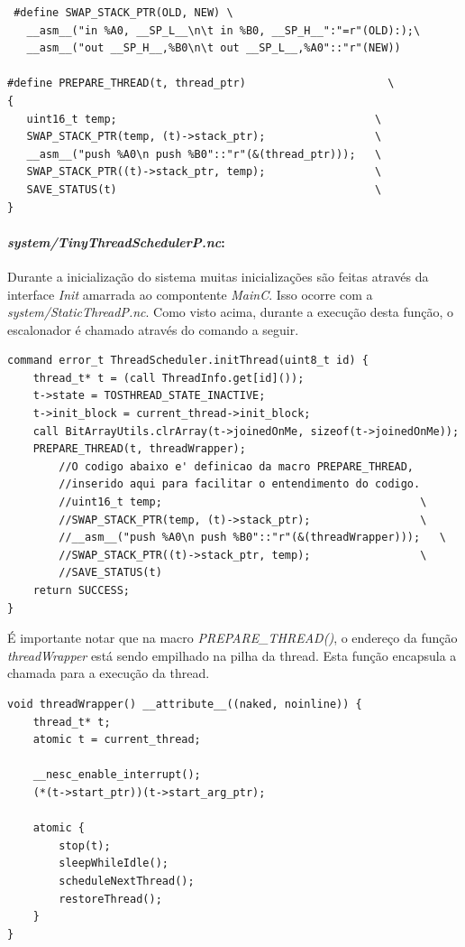 \begin{lstlisting}
 #define SWAP_STACK_PTR(OLD, NEW) \
   __asm__("in %A0, __SP_L__\n\t in %B0, __SP_H__":"=r"(OLD):);\
   __asm__("out __SP_H__,%B0\n\t out __SP_L__,%A0"::"r"(NEW))
 
#define PREPARE_THREAD(t, thread_ptr)                      \
{  
   uint16_t temp;                                        \
   SWAP_STACK_PTR(temp, (t)->stack_ptr);                 \
   __asm__("push %A0\n push %B0"::"r"(&(thread_ptr)));   \
   SWAP_STACK_PTR((t)->stack_ptr, temp);                 \
   SAVE_STATUS(t)                                        \
}
\end{lstlisting}

\paragraph{\textit{system/TinyThreadSchedulerP.nc}:}
Durante a inicialização do sistema muitas inicializações são feitas através da interface \textit{Init} amarrada ao
compontente \textit{MainC}. Isso ocorre com a \textit{system/StaticThreadP.nc}. Como visto acima, durante a execução
desta função, o escalonador é chamado através do comando a seguir.
\begin{lstlisting}
command error_t ThreadScheduler.initThread(uint8_t id) {
    thread_t* t = (call ThreadInfo.get[id]());
    t->state = TOSTHREAD_STATE_INACTIVE;
    t->init_block = current_thread->init_block;
    call BitArrayUtils.clrArray(t->joinedOnMe, sizeof(t->joinedOnMe));
    PREPARE_THREAD(t, threadWrapper);
        //O codigo abaixo e' definicao da macro PREPARE_THREAD,
        //inserido aqui para facilitar o entendimento do codigo.
        //uint16_t temp;                                        \
        //SWAP_STACK_PTR(temp, (t)->stack_ptr);                 \
        //__asm__("push %A0\n push %B0"::"r"(&(threadWrapper)));   \
        //SWAP_STACK_PTR((t)->stack_ptr, temp);                 \
        //SAVE_STATUS(t)   
    return SUCCESS;
}
\end{lstlisting}
É importante notar que na macro \textit{PREPARE\_THREAD()}, o endereço da função \textit{threadWrapper} está sendo
empilhado na pilha da thread. Esta função encapsula a chamada para a execução da thread.
\begin{lstlisting}
void threadWrapper() __attribute__((naked, noinline)) {
    thread_t* t;
    atomic t = current_thread;

    __nesc_enable_interrupt();
    (*(t->start_ptr))(t->start_arg_ptr);

    atomic {
        stop(t);
        sleepWhileIdle();
        scheduleNextThread();
        restoreThread();
    }
}
\end{lstlisting}

